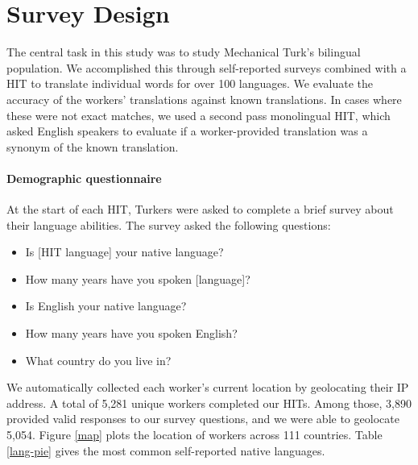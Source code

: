 \documentclass[11pt]{article}
\begin{document}
\section{Survey Design}
The central task in this study was to study Mechanical Turk's bilingual population.  We accomplished this through self-reported surveys combined with a HIT to translate individual words for over 100 languages.  We evaluate the accuracy of the workers' translations against known translations.  In cases where these were not exact matches, we used a second pass monolingual HIT, which asked English speakers to evaluate if a worker-provided translation was a synonym of the known translation.


\paragraph{Demographic questionnaire}

At the start of each HIT, Turkers were asked to complete a brief survey about their language abilities. The survey asked the following questions:
\begin{itemize}
\item Is [HIT language] your native language? 
\item How many years have you spoken [language]? 
\item Is English your native language? 
\item How many years have you spoken English?
\item What country do you live in?
\end{itemize}
We automatically collected each worker's current location by geolocating their IP address.  A total of 5,281 unique workers completed our HITs.  Among those, 3,890 provided valid responses to our survey questions, and we were able to geolocate 5,054.  Figure \ref{map} plots the location of workers across 111 countries.  Table \ref{lang-pie} gives the most common self-reported native languages. 

\end{document}
